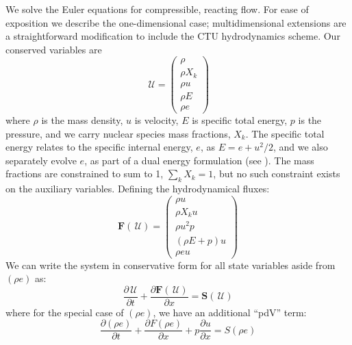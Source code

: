 \documentclass{aastex63}
\newcommand{\ddx}[1]{{\frac{{\partial#1}}{\partial x}}}
\newcommand{\ddt}[1]{{\frac{{\partial#1}}{\partial t}}}
\newcommand{\Uc}{{\,\bm{\mathcal{U}}}}
\newcommand{\Fb}{\mathbf{F}}
\newcommand{\Sc}{\mathbf{S}}
\begin{document}
We solve the Euler equations for compressible, reacting flow.  For ease
of exposition we describe the one-dimensional case;
multidimensional extensions are a straightforward modification to
include the CTU hydrodynamics scheme.  Our conserved variables are
\begin{equation}
  \Uc = \left ( \begin{array}{c}
           \rho \\
           \rho X_k \\
           \rho u \\
           \rho E \\
           \rho e \end{array}\right )
\end{equation}
where $\rho$ is the mass density, $u$ is velocity, $E$ is specific
total energy, $p$ is the pressure, and we carry nuclear species mass
fractions, $X_k$.  The specific total
energy relates to the specific internal energy, $e$, as $E = e + u^2/2$,
and we also separately evolve $e$, as part of a dual
energy formulation (see \citealt{bryan:1995,wdmergerI}).
 The mass fractions are constrained to sum to 1, $\sum_k X_k = 1$, but
 no such constraint exists on the auxiliary variables. 
Defining the hydrodynamical fluxes:
\begin{equation}
  \Fb(\Uc) = \left ( \begin{array}{c}
         \rho u \\
         \rho X_k u \\
         \rho u^2 p \\
         (\rho E + p) u \\
         \rho e u \end{array}\right )
\end{equation}
We can write the system in conservative form for all state variables aside from $(\rho e)$ as:
\begin{equation}
  \ddt{\Uc} + \ddx{\Fb(\Uc)} = \Sc(\Uc)
\end{equation}
where for the special case of $(\rho e)$, we have an additional ``pdV'' term:
\begin{equation}
\ddt{(\rho e)} + \ddx{F(\rho e)} + p \ddx{u} = S(\rho e)
\end{equation}
\end{document}
